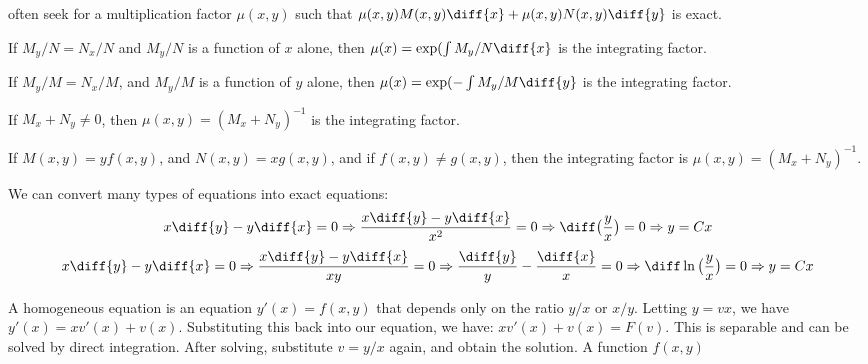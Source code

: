 \documentclass[crop=false,class=article,oneside]{standalone}
\begin{document}
        often seek for a multiplication factor $\mu(x,y)$ such that
        $\mu(x,y)M(x,y)\diff{x}+\mu(x,y)N(x,y)\diff{y}$ is exact.
        \begin{theorem}
            If $M_{y}/N=N_{x}/N$ and $M_{y}/N$ is a function of
            $x$ alone, then $\mu(x)=\exp(\int{M_{y}/N}\diff{x}$ is
            the integrating factor.
        \end{theorem}
        \begin{theorem}
            If $M_{y}/M=N_{x}/M$, and
            $M_{y}/M$ is a function of $y$ alone, then
            $\mu(x)=\exp(-\int{M_{y}/M}\diff{y}$ is the
            integrating factor.
        \end{theorem}
        \begin{theorem}
            If $M_{x}+N_{y}\ne{0}$, then
            $\mu(x,y)=(M_{x}+N_{y})^{-1}$ is
            the integrating factor.
        \end{theorem}
        \begin{theorem}
            If $M(x,y)=yf(x,y)$, and
            $N(x,y)=xg(x,y)$, and if
            $f(x,y)\ne{g(x,y)}$, then the
            integrating factor is
            $\mu(x,y)=(M_{x}+N_{y})^{-1}$.
        \end{theorem}
        \begin{example}
            We can convert many types of equations into exact
            equations:
            \begin{equation*}
                x\diff{y}-y\diff{x}=0
                \Rightarrow\frac{x\diff{y}-y\diff{x}}{x^{2}}=0
                \Rightarrow\diff\big(\frac{y}{x}\big)=0
                \Rightarrow{y=Cx}
            \end{equation*}
            \begin{equation*}
                x\diff{y}-y\diff{x}=0
                \Rightarrow\frac{x\diff{y}-y\diff{x}}{xy}=0
                \Rightarrow\frac{\diff{y}}{y}-\frac{\diff{x}}{x}=0
                \Rightarrow\diff\ln\big(\frac{y}{x}\big)=0
                \Rightarrow{y=Cx}
            \end{equation*}
        \end{example}
        A homogeneous equation is an equation $y'(x)=f(x,y)$
        that depends only on the ratio $y/x$ or $x/y$.
        Letting $y=vx$, we have $y'(x)=xv'(x)+v(x)$.
        Substituting this back into our equation, we have:
        $xv'(x)+v(x)=F(v)$. This is separable and can be solved
        by direct integration. After solving, substitute
        $v=y/x$ again, and obtain the solution. A function $f(x,y)$
\end{document}
